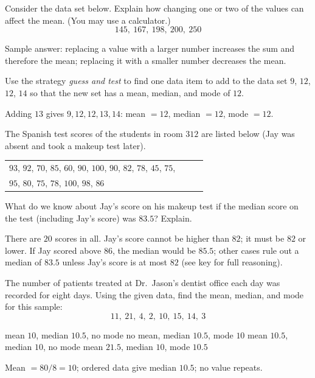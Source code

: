 \newpage



\question[10]
Consider the data set below. Explain how changing one or two of the values can affect the mean. (You may use a calculator.)
\[
  145,\ 167,\ 198,\ 200,\ 250
\]
\makeemptybox{1.8in}
\begin{solution}
  Sample answer: replacing a value with a larger number increases the sum and therefore the mean; replacing it with a smaller number decreases the mean.
\end{solution}

\question[5]
Use the strategy \emph{guess and test} to find one data item to add to the data set $9$, $12$, $12$, $14$ so that the new set has a mean, median, and mode of $12$.
\begin{solution}
  Adding $13$ gives $9,12,12,13,14$: mean $=12$, median $=12$, mode $=12$.
\end{solution}

\question[10]
The Spanish test scores of the students in room $312$ are listed below (Jay was absent and took a makeup test later).
\begin{center}
  \small 
  \begin{tabular}{p{0.88\linewidth}}
    $93$, $92$, $70$, $85$, $60$, $90$, $100$, $90$, $82$, $78$, $45$, $75$, \\
    $95$, $80$, $75$, $78$, $100$, $98$, $86$
  \end{tabular}
\end{center}
What do we know about Jay's score on his makeup test if the median score on the test (including Jay's score) was $83.5$? Explain.
\makeemptybox{1.2in}
\begin{solution}
  There are $20$ scores in all. Jay's score cannot be higher than $82$; it must be $82$ or lower. If Jay scored above $86$, the median would be $85.5$; other cases rule out a median of $83.5$ unless Jay's score is at most $82$ (see key for full reasoning).
\end{solution}


\newpage


\question[5]
The number of patients treated at Dr.\ Jason's dentist office each day was recorded for eight days. Using the given data, find the mean, median, and mode for this sample:
\[
  11,\ 21,\ 4,\ 2,\ 10,\ 15,\ 14,\ 3
\]
\begin{choices}
  \CorrectChoice mean $10$, median $10.5$, no mode
  \choice no mean, median $10.5$, mode $10$
  \choice mean $10.5$, median $10$, no mode
  \choice mean $21.5$, median $10$, mode $10.5$
\end{choices}
\begin{solution}
  Mean $= 80/8 = 10$; ordered data give median $10.5$; no value repeats.
\end{solution}

